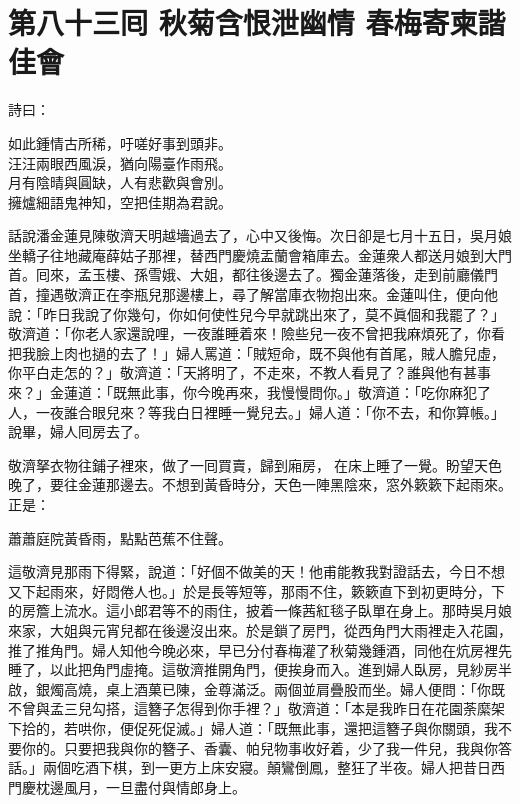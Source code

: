 
\chapter*{第八十三囘 秋菊含恨泄幽情 春梅寄柬諧佳會}


詩曰：

\begin{myquote}
如此鍾情古所稀，吁嗟好事到頭非。\\汪汪兩眼西風淚，猶向陽臺作雨飛。\\月有陰晴與圓缺，人有悲歡與會別。\\擁爐細語鬼神知，空把佳期為君說。
\end{myquote}

話說潘金蓮見陳敬濟天明越墻過去了，心中又後悔。{}次日卻是七月十五日，吳月娘坐轎子往地藏庵薛姑子那裡，替西門慶燒盂蘭會箱庫去。金蓮衆人都送月娘到大門首。囘來，孟玉樓、孫雪娥、大姐，都往後邊去了。獨金蓮落後，走到前廳儀門首，撞遇敬濟正在李瓶兒那邊樓上，尋了解當庫衣物抱出來。金蓮叫住，便向他說：「昨日我說了你幾句，你如何使性兒今早就跳出來了，莫不眞個和我罷了？」敬濟道：「你老人家還說哩，一夜誰睡着來！險些兒一夜不曾把我麻煩死了，你看把我臉上肉也撾的去了！」婦人罵道：「賊短命，既不與他有首尾，賊人膽兒虛，你平白走怎的？」{}敬濟道：「天將明了，不走來，不教人看見了？誰與他有甚事來？」金蓮道：「既無此事，你今晚再來，我慢慢問你。」敬濟道：「吃你麻犯了人，一夜誰合眼兒來？等我白日裡睡一覺兒去。」婦人道：「你不去，和你算帳。」{}說畢，婦人囘房去了。

敬濟拏衣物往鋪子裡來，做了一囘買賣，歸到廂房，𢱉在床上睡了一覺。盼望天色晚了，要往金蓮那邊去。不想到黃昏時分，天色一陣黑陰來，窓外簌簌下起雨來。{}正是：

\begin{myquote}
蕭蕭庭院黃昏雨，點點芭蕉不住聲。
\end{myquote}

這敬濟見那雨下得緊，說道：「好個不做美的天！他甫能教我對證話去，今日不想又下起雨來，好悶倦人也。」於是長等短等，那雨不住，簌簌直下到初更時分，下的房簷上流水。這小郎君等不的雨住，披着一條茜紅毯子臥單在身上。{}那時吳月娘來家，大姐與元宵兒都在後邊沒出來。於是鎖了房門，從西角門大雨裡走入花園，推了推角門。婦人知他今晚必來，早已分付春梅灌了秋菊幾鍾酒，同他在炕房裡先睡了，以此把角門虛掩。這敬濟推開角門，便挨身而入。進到婦人臥房，見紗房半啟，銀燭高燒，桌上酒菓已陳，金尊滿泛。兩個並肩疊股而坐。婦人便問：「你既不曾與孟三兒勾搭，這簪子怎得到你手裡？」敬濟道：「本是我昨日在花園荼縻架下拾的，若哄你，便促死促滅。」婦人道：「既無此事，還把這簪子與你關頭，{}我不要你的。只要把我與你的簪子、香囊、帕兒物事收好着，少了我一件兒，我與你答話。」兩個吃酒下棋，到一更方上床安寢。顛鸞倒鳳，整狂了半夜。婦人把昔日西門慶枕邊風月，一旦盡付與情郎身上。

